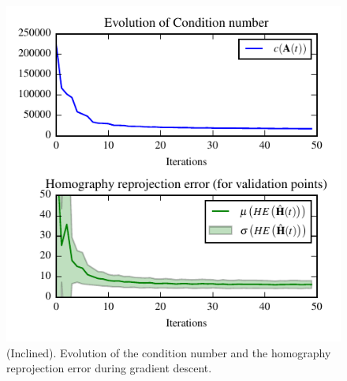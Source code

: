 \documentclass[letterpaper, 10 pt, conference]{ieeeconf}  %
\begin{document}
	\begin{figure}[t]
		\begin{center}
			\includegraphics[width=\columnwidth]{img/homography_inclined.pdf}
			\caption{\label{fig:IN_cond_homo_error} \small(Inclined). Evolution of the condition number and the homography reprojection error during gradient descent.}
		\end{center}
		\vspace{-0.5cm}
	\end{figure}
	
\end{document}
